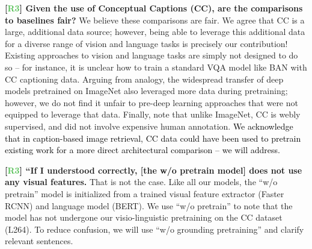 \documentclass{article}
\newcommand{\xhdr}[1]{\vspace{0pt}\noindent\textbf{#1}}
\newcommand{\sml}[1]{\textcolor{Black}{#1}}
\newcommand{\three}{\textbf{\textcolor[HTML]{55c055}{R3}}}
\renewcommand{\xhdr}[1]{\noindent \textbf{#1}}
\begin{document}
\xhdr{[\three] Given the use of Conceptual Captions (CC), are the comparisons to baselines fair?} We believe these comparisons are fair. We agree that CC is a large, additional data source; however, being able to leverage this additional data for a diverse range of vision and language tasks is precisely our contribution! Existing approaches to vision and language tasks are simply not designed to do so -- for instance, it is unclear how to train a standard VQA model like BAN with CC captioning data. Arguing from analogy, the widespread transfer of deep models pretrained on ImageNet also leveraged more data during pretraining; however, we do not find it unfair to pre-deep learning approaches that were not equipped to leverage that data. Finally, note that unlike ImageNet, CC is webly supervised, and did not involve expensive human annotation. \sml{We acknowledge that in caption-based image retrieval, CC data could have been used to pretrain existing work for a more direct architectural comparison -- we will address.}
 


\xhdr{[\three] ``If I understood correctly, [the w/o pretrain model] does not use any visual features.} That is not the case.  Like all our models, the ``w/o pretrain'' model is initialized from a trained visual feature extractor (Faster RCNN) and language model (BERT). We use ``w/o pretrain'' to note that the model has not undergone our visio-linguistic pretraining on the CC dataset (L264). To reduce confusion, we will use ``w/o grounding pretraining'' and clarify relevant sentences.
\end{document}
